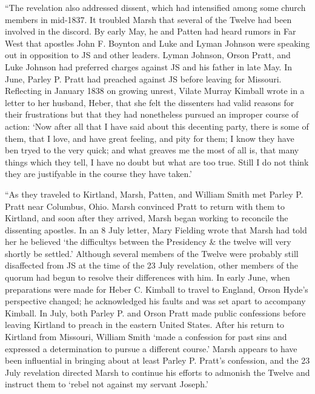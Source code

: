 			``The revelation also addressed dissent, which had intensified among some church members in mid-1837. It troubled Marsh that several of the Twelve had been involved in the discord. By early May, he and Patten had heard rumors in Far West that apostles John F. Boynton and Luke and Lyman Johnson were speaking out in opposition to JS and other leaders. Lyman Johnson, Orson Pratt, and Luke Johnson had preferred charges against JS and his father in late May. In June, Parley P. Pratt had preached against JS before leaving for Missouri. Reflecting in January 1838 on growing unrest, Vilate Murray Kimball wrote in a letter to her husband, Heber, that she felt the dissenters had valid reasons for their frustrations but that they had nonetheless pursued an improper course of action: `Now after all that I have said about this decenting party, there is some of them, that I love, and have great feeling, and pity for them; I know they have ben tryed to the very quick; and what greaves me the most of all is, that many things which they tell, I have no doubt but what are too true. Still I do not think they are justifyable in the course they have taken.'

			``As they traveled to Kirtland, Marsh, Patten, and William Smith met Parley P. Pratt near Columbus, Ohio. Marsh convinced Pratt to return with them to Kirtland, and soon after they arrived, Marsh began working to reconcile the dissenting apostles. In an 8 July letter, Mary Fielding wrote that Marsh had told her he believed `the difficultys between the Presidency \& the twelve will very shortly be settled.' Although several members of the Twelve were probably still disaffected from JS at the time of the 23 July revelation, other members of the quorum had begun to resolve their differences with him. In early June, when preparations were made for Heber C. Kimball to travel to England, Orson Hyde's perspective changed; he acknowledged his faults and was set apart to accompany Kimball. In July, both Parley P. and Orson Pratt made public confessions before leaving Kirtland to preach in the eastern United States. After his return to Kirtland from Missouri, William Smith `made a confession for past sins and expressed a determination to pursue a different course.' Marsh appears to have been influential in bringing about at least Parley P. Pratt's confession, and the 23 July revelation directed Marsh to continue his efforts to admonish the Twelve and instruct them to `rebel not against my servant Joseph.'

